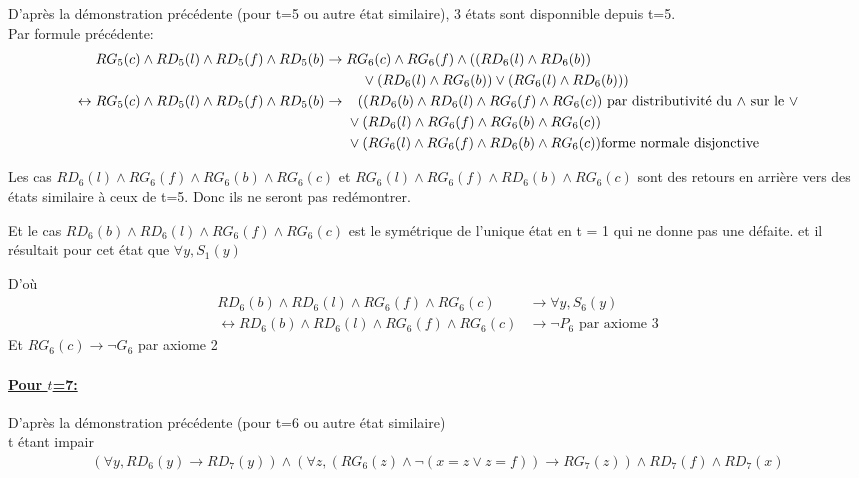 \documentclass{article}
\begin{document}
D'après la démonstration précédente (pour t=5 ou autre état similaire), 3 états sont disponnible depuis t=5.\\ Par formule précédente:
\begin{align*}
  RG_5(c) \wedge RD_5(l) \wedge RD_5(f) \wedge RD_5(b)&\to RG_6(c) \wedge RG_6(f) \wedge ((RD_6(l)\wedge RD_6(b))\\
  & \hphantom{aaaaa} \vee (RD_6(l)\wedge RG_6(b)) \vee(RG_6(l)\wedge RD_6(b)))\\
  \leftrightarrow RG_5(c) \wedge RD_5(l) \wedge RD_5(f) \wedge RD_5(b) &\to\hphantom{a|} (( RD_6(b) \wedge RD_6(l) \wedge RG_6(f) \wedge RG_6(c))\text{ par distributivité du $\wedge$ sur le $\vee$}\\
  & \hphantom{aaa} \vee (RD_6(l) \wedge RG_6(f) \wedge RG_6(b) \wedge RG_6(c))\\
  & \hphantom{aaa} \vee (RG_6(l) \wedge RG_6(f) \wedge RD_6(b) \wedge RG_6(c))\text{forme normale disjonctive}\\
\end{align*}

Les cas $RD_6(l) \wedge RG_6(f) \wedge RG_6(b) \wedge RG_6(c)$ et $RG_6(l) \wedge RG_6(f) \wedge RD_6(b) \wedge RG_6(c)$ sont des retours en arrière vers des états similaire à ceux de t=5. Donc ils ne seront pas redémontrer.

Et le cas $RD_6(b) \wedge RD_6(l) \wedge RG_6(f) \wedge RG_6(c)$ est le symétrique de l'unique état en t = 1 qui ne donne pas une défaite. et il résultait pour cet état que  $\forall y, S_1(y)$

 D'où
\begin{align*}
  RD_6(b) \wedge RD_6(l) \wedge RG_6(f) \wedge RG_6(c) &\to \forall y, S_6(y)\\
  \leftrightarrow RD_6(b) \wedge RD_6(l) \wedge RG_6(f) \wedge RG_6(c) &\to \neg P_6 \text{ par axiome 3}
\end{align*}
Et $RG_6(c) \to \neg G_6$ par axiome 2

\paragraph{\underline{Pour $t$=7:}}

D'après la démonstration précédente (pour t=6 ou autre état similaire)\\
t étant impair
\begin{align*}
    (\forall y, RD_6(y) \to RD_{7}(y)) \wedge (\forall z,(RG_6(z) \wedge \neg(x=z \vee z=f)) \rightarrow RG_7(z)) \wedge RD_7(f) \wedge RD_7(x)
\end{align*}
\end{document}
